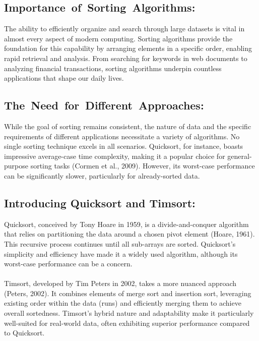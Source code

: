 \documentclass[a4paper, 9pt, twocolumn]{article}
\begin{document}
\subsection[left=0pt]{\hbox{Importance of Sorting Algorithms:}}
The ability to efficiently organize and search through large datasets is vital in almost every aspect of modern computing. Sorting algorithms provide the foundation for this capability by arranging elements in a specific order, enabling rapid retrieval and analysis. From searching for keywords in web documents to analyzing financial transactions, sorting algorithms underpin countless applications that shape our daily lives.
\subsection{\mbox{The Need for Different Approaches:}}

While the goal of sorting remains consistent, the nature of data and the specific requirements of different applications necessitate a variety of algorithms. No single sorting technique excels in all scenarios. Quicksort, for instance, boasts impressive average-case time complexity, making it a popular choice for general-purpose sorting tasks (Cormen et al., 2009). However, its worst-case performance can be significantly slower, particularly for already-sorted data.

\subsection{Introducing Quicksort and Timsort:}
Quicksort, conceived by Tony Hoare in 1959, is a divide-and-conquer algorithm that relies on partitioning the data around a chosen pivot element (Hoare, 1961). This recursive process continues until all sub-arrays are sorted. Quicksort's simplicity and efficiency have made it a widely used algorithm, although its worst-case performance can be a concern.\\\\
Timsort, developed by Tim Peters in 2002, takes a more nuanced approach (Peters, 2002). It combines elements of merge sort and insertion sort, leveraging existing order within the data (runs) and efficiently merging them to achieve overall sortedness. Timsort's hybrid nature and adaptability make it particularly well-suited for real-world data, often exhibiting superior performance compared to Quicksort.
\end{document}
